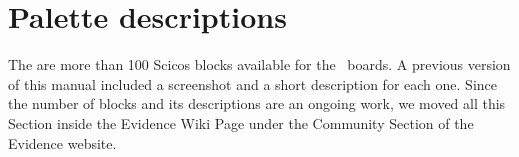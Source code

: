 
\section{Palette descriptions}

The are more than 100 Scicos blocks available for the \flex\ boards. A
previous version of this manual included a screenshot and a short
description for each one. Since the number of blocks and its
descriptions are an ongoing work, we moved all this Section inside the
Evidence Wiki Page under the Community Section of the Evidence
website.

